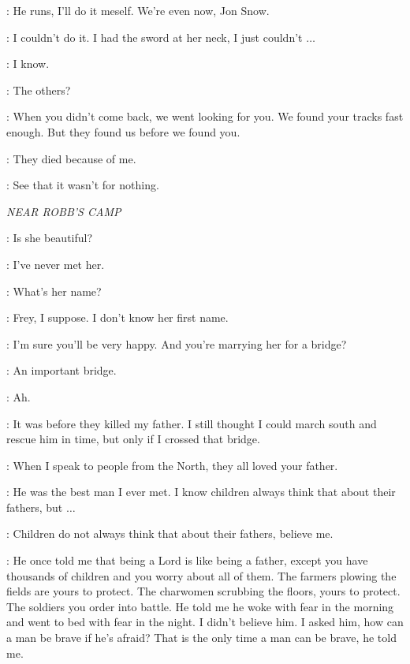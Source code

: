 \YGRITTE: He runs, I'll do it meself. We're even now, Jon Snow. 


\JON: I couldn't do it. I had the sword at her neck, I just couldn't $\ldots$  

\HALFHAND: I know. 

\JON: The others? 

\HALFHAND: When you didn't come back, we went looking for you. We found your tracks fast enough. But they found us before we found you. 

\JON: They died because of me. 

\HALFHAND: See that it wasn't for nothing. 


\scene

\textit{NEAR ROBB'S CAMP} 


\TALISA: Is she beautiful? 

\ROBB: I've never met her. 

\TALISA: What's her name? 

\ROBB: Frey, I suppose. I don't know her first name. 

\TALISA: I'm sure you'll be very happy.  And you're marrying her for a bridge? 

\ROBB: An important bridge. 

\TALISA: Ah. 

\ROBB: It was before they killed my father. I still thought I could march south and rescue him in time, but only if I crossed that bridge. 

\TALISA: When I speak to people from the North, they all loved your father. 

\ROBB: He was the best man I ever met. I know children always think that about their fathers, but $\ldots$  

\TALISA: Children do not always think that about their fathers, believe me. 

\ROBB: He once told me that being a Lord is like being a father, except you have thousands of children and you worry about all of them. The farmers plowing the fields are yours to protect. The charwomen scrubbing the floors, yours to protect. The soldiers you order into battle. He told me he woke with fear in the morning and went to bed with fear in the night. I didn't believe him. I asked him, how can a man be brave if he's afraid? That is the only time a man can be brave, he told me. 

